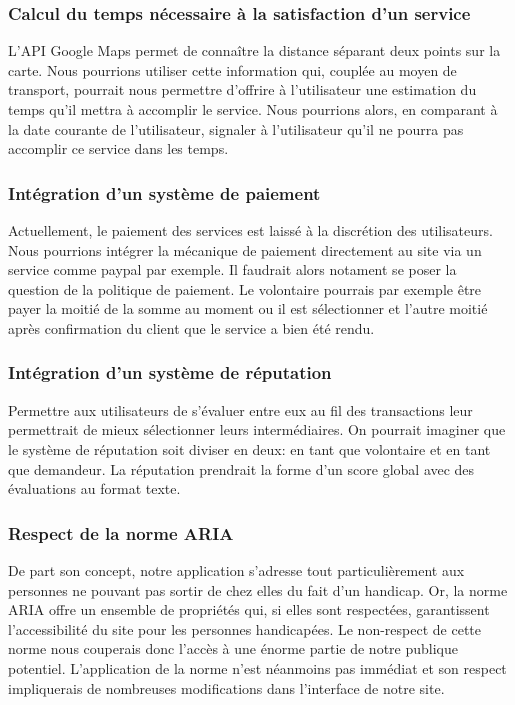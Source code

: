\subsubsection{Calcul du temps nécessaire à la satisfaction d'un service}
L'API Google Maps permet de connaître la distance séparant deux points sur la carte. Nous pourrions utiliser cette information qui, couplée au moyen de transport, pourrait nous permettre d'offrire à l'utilisateur une estimation du temps qu'il mettra à accomplir le service. Nous pourrions alors, en comparant à la date courante de l'utilisateur, signaler à l'utilisateur qu'il ne pourra pas accomplir ce service dans les temps.

\subsubsection{Intégration d'un système de paiement}
Actuellement, le paiement des services est laissé à la discrétion des utilisateurs. Nous pourrions intégrer la mécanique de paiement directement au site via un service comme paypal par exemple. Il faudrait alors notament se poser la question de la politique de paiement. Le volontaire pourrais par exemple être payer la moitié de la somme au moment ou il est sélectionner et l'autre moitié après confirmation du client que le service a bien été rendu.

\subsubsection{Intégration d'un système de réputation}
Permettre aux utilisateurs de s'évaluer entre eux au fil des transactions leur permettrait de mieux sélectionner leurs intermédiaires. On pourrait imaginer que le système de réputation soit diviser en deux: en tant que volontaire et en tant que demandeur. La réputation prendrait la forme d'un score global avec des évaluations au format texte.

\subsubsection{Respect de la norme ARIA}
De part son concept, notre application s'adresse tout particulièrement aux personnes ne pouvant pas sortir de chez elles du fait d'un handicap. Or, la norme ARIA offre un ensemble de propriétés qui, si elles sont respectées, garantissent l'accessibilité du site pour les personnes handicapées. Le non-respect de cette norme nous couperais donc l'accès à une énorme partie de notre publique potentiel. L'application de la norme n'est néanmoins pas immédiat et son respect impliquerais de nombreuses modifications dans l'interface de notre site.

